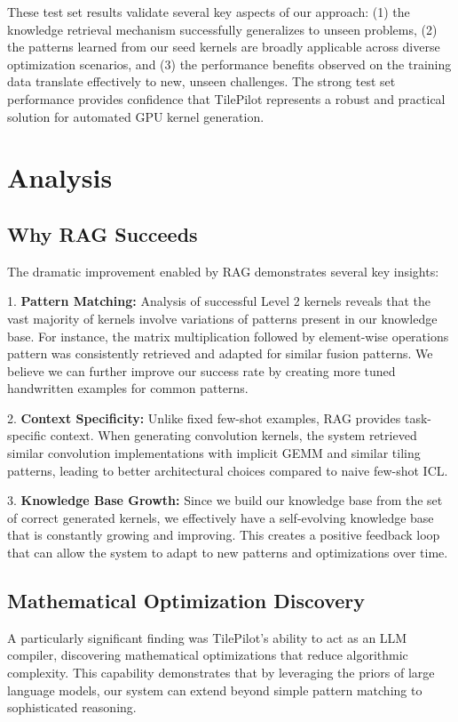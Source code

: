 \documentclass{article}
\begin{document}
These test set results validate several key aspects of our approach: (1) the knowledge retrieval mechanism successfully generalizes to unseen problems, (2) the patterns learned from our seed kernels are broadly applicable across diverse optimization scenarios, and (3) the performance benefits observed on the training data translate effectively to new, unseen challenges. The strong test set performance provides confidence that TilePilot represents a robust and practical solution for automated GPU kernel generation.

\section{Analysis}

\subsection{Why RAG Succeeds}

The dramatic improvement enabled by RAG demonstrates several key insights:

1. \textbf{Pattern Matching:} Analysis of successful Level 2 kernels reveals that the vast majority of kernels involve variations of patterns present in our knowledge base. For instance, the matrix multiplication followed by element-wise operations pattern was consistently retrieved and adapted for similar fusion patterns. We believe we can further improve our success rate by creating more tuned handwritten examples for common patterns.

2. \textbf{Context Specificity:} Unlike fixed few-shot examples, RAG provides task-specific context. When generating convolution kernels, the system retrieved similar convolution implementations with implicit GEMM and similar tiling patterns, leading to better architectural choices compared to naive few-shot ICL.

3. \textbf{Knowledge Base Growth:} Since we build our knowledge base from the set of correct generated kernels, we effectively have a self-evolving knowledge base that is constantly growing and improving. This creates a positive feedback loop that can allow the system to adapt to new patterns and optimizations over time.

\subsection{Mathematical Optimization Discovery}

A particularly significant finding was TilePilot's ability to act as an LLM compiler, discovering mathematical optimizations that reduce algorithmic complexity. This capability demonstrates that by leveraging the priors of large language models, our system can extend beyond simple pattern matching to sophisticated reasoning.
\end{document}
